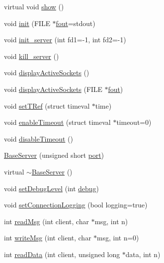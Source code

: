 \begin{DoxyCompactItemize}
virtual void \hyperlink{classBaseServer_ad624f5b571be84795564f5591b935447}{show} ()
\item 
void \hyperlink{classBaseServer_a24c84f0313d09d3a3585b3dcaf7dccd9}{init} (F\-I\-L\-E $\ast$\hyperlink{classBaseServer_a9ad43261a042fbeeafee33ca4c0b3fd3}{fout}=stdout)
\item 
void \hyperlink{classBaseServer_aab359a913d5494d783178c7887f0e3ef}{init\-\_\-server} (int fd1=-\/1, int fd2=-\/1)
\item 
void \hyperlink{classBaseServer_a377c95f40422ee8c80f8344a0e90cb3a}{kill\-\_\-server} ()
\item 
void \hyperlink{classBaseServer_ae3172b36c67a4cfd5eac9770f9ea8172}{display\-Active\-Sockets} ()
\item 
void \hyperlink{classBaseServer_ae06367103d97f105e8cbb97ee81c8b83}{display\-Active\-Sockets} (F\-I\-L\-E $\ast$\hyperlink{classBaseServer_a9ad43261a042fbeeafee33ca4c0b3fd3}{fout})
\item 
void \hyperlink{classBaseServer_abfda17e7318193d8fc397f2bc67b6d0b}{set\-T\-Ref} (struct timeval $\ast$time)
\item 
void \hyperlink{classBaseServer_a61ab16b5f61c3f28e75ed57c2f56110e}{enable\-Timeout} (struct timeval $\ast$timeout=0)
\item 
void \hyperlink{classBaseServer_aff06d769604bc32179ea3adb54ccaefc}{disable\-Timeout} ()
\item 
\hyperlink{classBaseServer_a04931ee29456204b3ef3eb8f7d496f3b}{Base\-Server} (unsigned short \hyperlink{classBaseServer_a66052c095234e31cada29b678b039c68}{port})
\item 
virtual \hyperlink{classBaseServer_a5aa74bf7b8d3f41b9002107b03a91977}{$\sim$\-Base\-Server} ()
\item 
void \hyperlink{classBaseServer_aa62de94b6fdf829df0cffe05db5f6120}{set\-Debug\-Level} (int \hyperlink{classBaseServer_a078ea2911e24a247cfec950e13bb78dc}{debug})
\item 
void \hyperlink{classBaseServer_a8718ce2924a44417b363901df8c23eb3}{set\-Connection\-Logging} (bool logging=true)
\item 
int \hyperlink{classBaseServer_afde0942ae323e3a4b3e748d227b24c55}{read\-Msg} (int client, char $\ast$msg, int n)
\item 
int \hyperlink{classBaseServer_a1841f7210f1e7083320d2c5c43a238d1}{write\-Msg} (int client, char $\ast$msg, int n=0)
\item 
int \hyperlink{classBaseServer_afdbd104f5be856c7c58426cacfeda1d1}{read\-Data} (int client, unsigned long $\ast$data, int n)

\end{DoxyCompactItemize}
